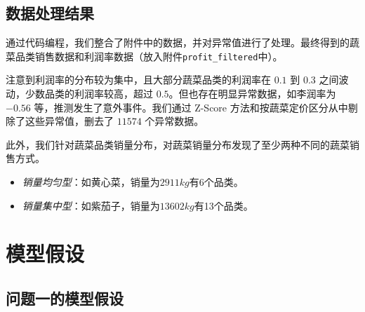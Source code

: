 \documentclass{article}
\begin{document}
\subsection{数据处理结果}
通过代码编程，我们整合了附件中的数据，并对异常值进行了处理。最终得到的蔬菜品类销售数据和利润率数据（放入附件\texttt{profit\_filtered}中）。

注意到利润率的分布较为集中，且大部分蔬菜品类的利润率在 $0.1$ 到 $0.3$ 之间波动，少数品类的利润率较高，超过 $0.5$。但也存在明显异常数据，如李润率为 $-0.56$ 等，推测发生了意外事件。我们通过 Z-Score 方法和按蔬菜定价区分从中剔除了这些异常值，删去了 $11574$ 个异常数据。

此外，我们针对蔬菜品类销量分布，对蔬菜销量分布发现了至少两种不同的蔬菜销售方式。
\begin{itemize}
    \item \textit{销量均匀型}：如黄心菜，销量为$2911 kg$有6个品类。
    \item \textit{销量集中型}：如紫茄子，销量为$13602 kg$有13个品类。
\end{itemize}
\section{模型假设}

\subsection{问题一的模型假设}
\end{document}
